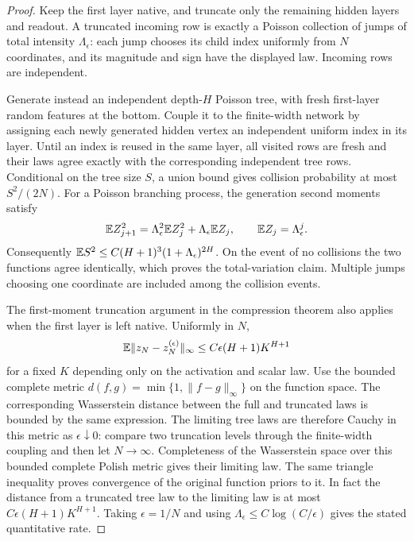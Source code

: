 \begin{proof}
Keep the first layer native, and truncate only the remaining hidden layers and readout. A truncated incoming row is exactly a Poisson collection of jumps of total intensity $\Lambda_\epsilon$: each jump chooses its child index uniformly from $N$ coordinates, and its magnitude and sign have the displayed law. Incoming rows are independent.

Generate instead an independent depth-$H$ Poisson tree, with fresh first-layer random features at the bottom. Couple it to the finite-width network by assigning each newly generated hidden vertex an independent uniform index in its layer. Until an index is reused in the same layer, all visited rows are fresh and their laws agree exactly with the corresponding independent tree rows. Conditional on the tree size $S$, a union bound gives collision probability at most $S^2/(2N)$. For a Poisson branching process, the generation second moments satisfy
\[
 \mathbb E Z_{j+1}^2=\Lambda_\epsilon^2\mathbb E Z_j^2
                         +\Lambda_\epsilon\mathbb E Z_j,
 \qquad \mathbb E Z_j=\Lambda_\epsilon^j.
\]
Consequently $\mathbb E S^2\le C(H+1)^3(1+\Lambda_\epsilon)^{2H}$. On the event of no collisions the two functions agree identically, which proves the total-variation claim. Multiple jumps choosing one coordinate are included among the collision events.

The first-moment truncation argument in the compression theorem also applies when the first layer is left native. Uniformly in $N$,
\[
 \mathbb E\|z_N-z_N^{(\epsilon)}\|_\infty
 \le C\epsilon(H+1)K^{H+1}
\]
for a fixed $K$ depending only on the activation and scalar law. Use the bounded complete metric
$d(f,g)=\min\{1,\|f-g\|_\infty\}$ on the function space. The corresponding Wasserstein distance between the full and truncated laws is bounded by the same expression. The limiting tree laws are therefore Cauchy in this metric as $\epsilon\downarrow0$: compare two truncation levels through the finite-width coupling and then let $N\to\infty$. Completeness of the Wasserstein space over this bounded complete Polish metric gives their limiting law. The same triangle inequality proves convergence of the original function priors to it. In fact the distance from a truncated tree law to the limiting law is at most $C\epsilon(H+1)K^{H+1}$. Taking $\epsilon=1/N$ and using $\Lambda_\epsilon\le C\log(C/\epsilon)$ gives the stated quantitative rate.
\end{proof}

